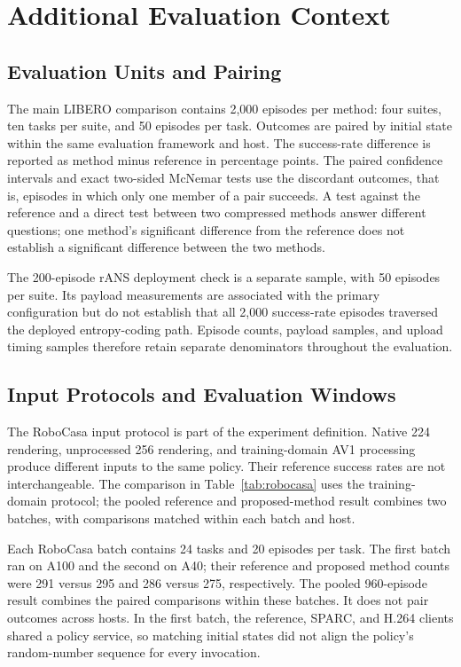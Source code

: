 \section{Additional Evaluation Context}
\label{app:context}
\subsection{Evaluation Units and Pairing}
The main LIBERO comparison contains 2,000 episodes per method: four
suites, ten tasks per suite, and 50 episodes per task. Outcomes are paired
by initial state within the same evaluation framework and host. The
success-rate difference is reported as method minus reference in
percentage points. The paired confidence intervals and exact two-sided
McNemar tests use the discordant outcomes, that is, episodes in which
only one member of a pair succeeds. A test against the reference and a
direct test between two compressed methods answer different questions;
one method's significant difference from the reference does not establish
a significant difference between the two methods.

The 200-episode rANS deployment check is a separate sample, with 50
episodes per suite. Its payload measurements are associated with the
primary configuration but do not establish that all 2,000 success-rate
episodes traversed the deployed entropy-coding path. Episode counts,
payload samples, and upload timing samples therefore retain separate
denominators throughout the evaluation.

\subsection{Input Protocols and Evaluation Windows}
The RoboCasa input protocol is part of the experiment definition.
Native 224 rendering, unprocessed 256 rendering, and training-domain AV1
processing produce different inputs to the same policy. Their reference
success rates are not interchangeable. The comparison in
Table~\ref{tab:robocasa} uses the training-domain protocol; the pooled
reference and proposed-method result combines two batches, with
comparisons matched within each batch and host.

Each RoboCasa batch contains 24 tasks and 20 episodes per task. The first
batch ran on A100 and the second on A40; their reference and proposed
method counts were 291 versus 295 and 286 versus 275, respectively.
The pooled 960-episode result combines the paired comparisons within
these batches. It does not pair outcomes across hosts. In the first
batch, the reference, SPARC, and H.264 clients shared a policy service,
so matching initial states did not align the policy's random-number
sequence for every invocation.

